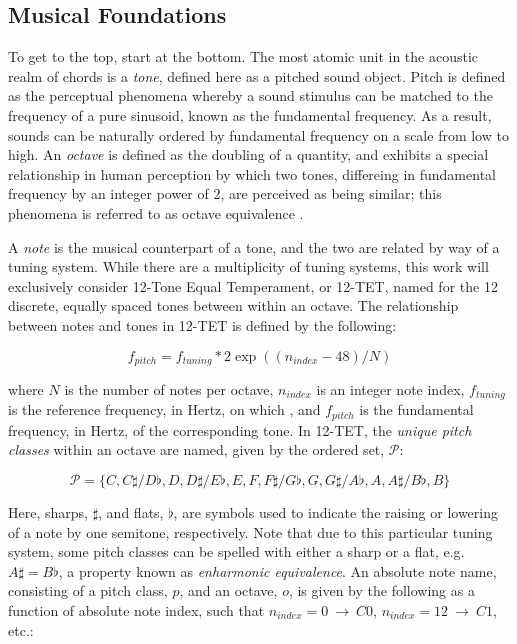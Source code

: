 \subsection{Musical Foundations}
\label{subsec:musical_foundations}

To get to the top, start at the bottom.
The most atomic unit in the acoustic realm of chords is a \emph{tone}, defined here as a pitched sound object.
Pitch is defined as the perceptual phenomena whereby a sound stimulus can be matched to the frequency of a pure sinusoid, known as the fundamental frequency.
As a result, sounds can be naturally ordered by fundamental frequency on a scale from low to high.
An \emph{octave} is defined as the doubling of a quantity, and exhibits a special relationship in human perception by which two tones, differeing in fundamental frequency by an integer power of 2, are perceived as being similar; this phenomena is referred to as octave equivalence \cite{?}.

A \emph{note} is the musical counterpart of a tone, and the two are related by way of a tuning system.
While there are a multiplicity of tuning systems, this work will exclusively consider 12-Tone Equal Temperament, or 12-TET, named for the 12 discrete, equally spaced tones between within an octave.
The relationship between notes and tones in 12-TET is defined by the following:

\begin{equation}
\label{eq:tuning}
f_{pitch} = f_{tuning} * 2 \exp((n_{index} - 48) / N)
\end{equation}

\noindent where $N$ is the number of notes per octave, $n_{index}$ is an integer note index, $f_{tuning}$ is the reference frequency, in Hertz, on which , and $f_{pitch}$ is the fundamental frequency, in Hertz, of the corresponding tone.
In 12-TET, the \emph{unique pitch classes} within an octave are named, given by the ordered set, $\mathcal{P}$:

\begin{equation}
\label{eq:pitch_classes}
\mathcal{P} = \{C, C\sharp / D\flat, D, D\sharp / E\flat, E, F, F\sharp / G\flat, G, G\sharp / A\flat, A, A\sharp / B\flat, B\}
\end{equation}

Here, sharps, $\sharp$, and flats, $\flat$, are symbols used to indicate the raising or lowering of a note by one semitone, respectively.
Note that due to this particular tuning system, some pitch classes can be spelled with either a sharp or a flat, e.g. $A\sharp = B\flat$, a property known as \emph{enharmonic equivalence}.
An absolute note name, consisting of a pitch class, $p$, and an octave, $o$, is given by the following as a function of absolute note index, such that $n_{index}=0~\to~C0$, $n_{index}=12~\to~C1$, etc.:


